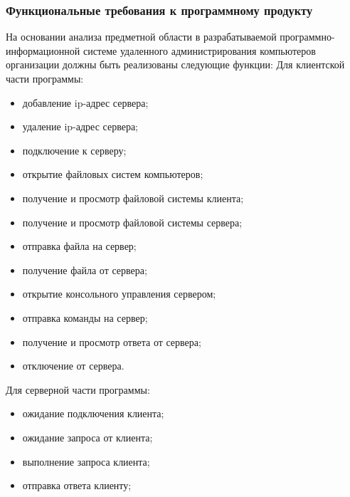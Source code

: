 \subsubsection{Функциональные требования к программному продукту}
На основании анализа предметной области в разрабатываемой программно-информационной системе удаленного администрирования компьютеров организации должны быть реализованы следующие функции:
Для клиентской части программы:
\begin{itemize}
	\item добавление ip-адрес сервера;
	\item удаление ip-адрес сервера;
	\item подключение к серверу;
	\item открытие файловых систем компьютеров;
	\item получение и просмотр файловой системы клиента;
	\item получение и просмотр файловой системы сервера;
	\item отправка файла на сервер;
	\item получение файла от сервера;
	\item открытие консольного управления сервером;
	\item отправка команды на сервер;
	\item получение и просмотр ответа от сервера;
	\item отключение от сервера.
\end{itemize}
Для серверной части программы:
\begin{itemize}
	\item ожидание подключения клиента;
	\item ожидание запроса от клиента;
	\item выполнение запроса клиента;
	\item отправка ответа клиенту;
\end{itemize}

